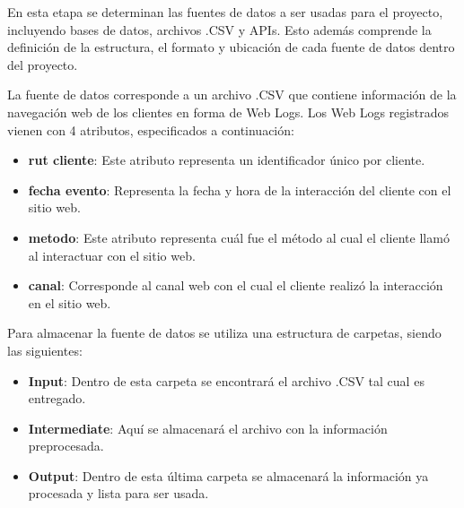 En esta etapa se determinan las fuentes de datos a ser usadas para el proyecto, incluyendo bases de datos, archivos .CSV y APIs. Esto además comprende la definición de la estructura, el formato y ubicación de cada fuente de datos dentro del proyecto.

La fuente de datos corresponde a un archivo .CSV que contiene información de la navegación web de los clientes en forma de Web Logs. Los Web Logs registrados vienen con 4 atributos, especificados a continuación:

\begin{itemize}
\item \textbf{rut cliente}: Este atributo representa un identificador único por cliente.
\item \textbf{fecha evento}: Representa la fecha y hora de la interacción del cliente con el sitio web.
\item \textbf{metodo}: Este atributo representa cuál fue el método al cual el cliente llamó al interactuar con el sitio web.
\item \textbf{canal}: Corresponde al canal web con el cual el cliente realizó la interacción en el sitio web.
\end{itemize}

Para almacenar la fuente de datos se utiliza una estructura de carpetas, siendo las siguientes:

\begin{itemize}
\item \textbf{Input}: Dentro de esta carpeta se encontrará el archivo .CSV tal cual es entregado.
\item \textbf{Intermediate}: Aquí se almacenará el archivo con la información preprocesada.
\item \textbf{Output}: Dentro de esta última carpeta se almacenará la información ya procesada y lista para ser usada.
\end{itemize}